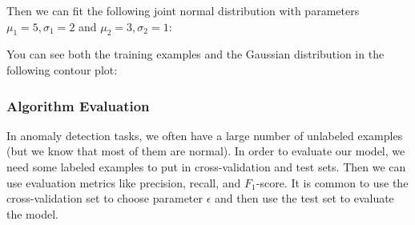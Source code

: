 \documentclass[a4paper, 12pt]{book}
\begin{document}
\begin{center}
  \centering
\end{center}

Then we can fit the following joint normal distribution with parameters $\mu_1 = 5, \sigma_1 = 2$ and $\mu_2 = 3, \sigma_2 = 1$:

\begin{center}
\end{center}

You can see both the training examples and the Gaussian distribution in the following contour plot:

\begin{center}
  \centering
\end{center}

\subsubsection{Algorithm Evaluation}

In anomaly detection tasks, we often have a large number of unlabeled examples (but we know that most of them are normal). In order to evaluate our model, we need some labeled examples to put in cross-validation and test sets. Then we can use evaluation metrics like precision, recall, and $F_1$-score. It is common to use the cross-validation set to choose parameter $\epsilon$ and then use the test set to evaluate the model.
\end{document}
